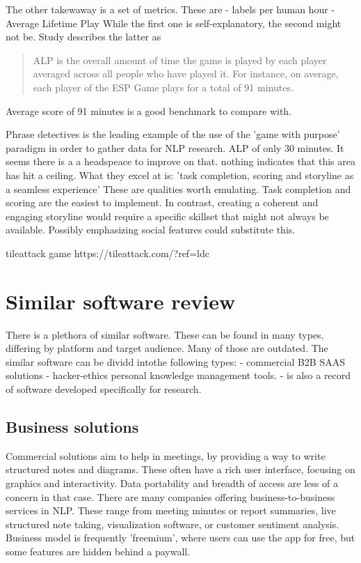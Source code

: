 \documentclass{report}
\begin{document}
The other takewaway is a set of metrics. These are
- labels per human hour
- Average Lifetime Play
While the first one is self-explanatory, the second might not be.
Study describes the latter as 
\begin{quote}
 ALP is the overall amount of time the game is played by each player averaged across all people who have played it. For instance, on average, each player of the ESP Game plays for a total of 91 minutes.
\end{quote}
Average score of 91 minutes is a good benchmark to compare with.

Phrase detectives \cite{poesio_phrase_2013} is the leading example of the use of the 'game with purpose' paradigm in order to gather data for NLP research.
ALP of only 30 minutes. It seems there is a a headspeace to improve on that. nothing indicates that this area has hit a ceiling.
What they excel at is: 'task completion, scoring and storyline as a seamless experience'
These are qualities worth emulating. Task completion and scoring are the easiest to implement. 
In contrast, creating a coherent and engaging storyline would require a specific skillset that might not always be available.
Possibly emphasizing social features could substitute this.

tileattack game
https://tileattack.com/?ref=ldc

\section{Similar software review}
There is a plethora of similar software. These can be found in many types, differing by platform and target audience. Many of those are outdated.
The similar software can be dividd intothe following types:
- commercial B2B SAAS solutions
- hacker-ethics personal knowledge management tools.
- is also a record of software developed specifically for research.

\subsection{Business solutions}
Commercial solutions aim to help in meetings, by providing a way to write structured notes and diagrams. These often have a rich user interface, focusing on graphics and interactivity.
Data portability and breadth of access are less of a concern in that case.
There are many companies offering business-to-business services in NLP.  These range from meeting minutes or report summaries, live structured note taking, visualization software, or customer sentiment analysis.  Business model is frequently 'freemium', where users can use the app for free, but some features are hidden behind a paywall.
\end{document}
